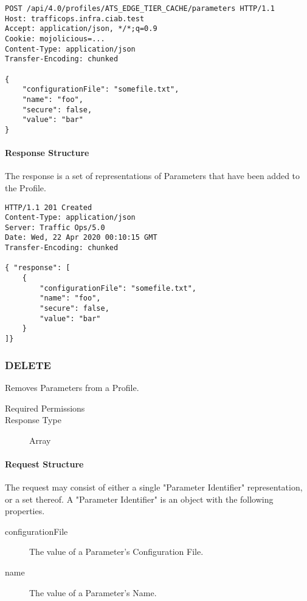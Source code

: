 \begin{codelisting}
\begin{verbatim}
POST /api/4.0/profiles/ATS_EDGE_TIER_CACHE/parameters HTTP/1.1
Host: trafficops.infra.ciab.test
Accept: application/json, */*;q=0.9
Cookie: mojolicious=...
Content-Type: application/json
Transfer-Encoding: chunked

{
	"configurationFile": "somefile.txt",
	"name": "foo",
	"secure": false,
	"value": "bar"
}
\end{verbatim}
\end{codelisting}

\paragraph{Response Structure}
The response is a set of representations of Parameters that have been added to
the Profile.

\begin{codelisting}
\begin{verbatim}
HTTP/1.1 201 Created
Content-Type: application/json
Server: Traffic Ops/5.0
Date: Wed, 22 Apr 2020 00:10:15 GMT
Transfer-Encoding: chunked

{ "response": [
	{
		"configurationFile": "somefile.txt",
		"name": "foo",
		"secure": false,
		"value": "bar"
	}
]}
\end{verbatim}
\end{codelisting}

\subsubsection{DELETE}
Removes Parameters from a Profile.

\begin{description}
	\item[Required Permissions] 
	\item[Response Type] Array
\end{description}

\paragraph{Request Structure}
The request may consist of either a single "Parameter Identifier" representation,
or a set thereof. A "Parameter Identifier" is an object with the following
properties.

\begin{description}
	\item[configurationFile] The value of a Parameter's Configuration File.
	\item[name] The value of a Parameter's Name.
\end{description}

